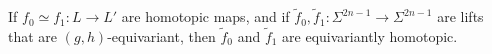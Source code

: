 If $f_0 \simeq f_1: L \to L'$ are homotopic maps, and if $\tilde{f}_0, \tilde{f}_1: \Sigma^{2n-1} \to \Sigma^{2n-1}$ are lifts that are $(g, h)$-equivariant, then $\tilde{f}_0$ and $\tilde{f}_1$ are equivariantly homotopic.
